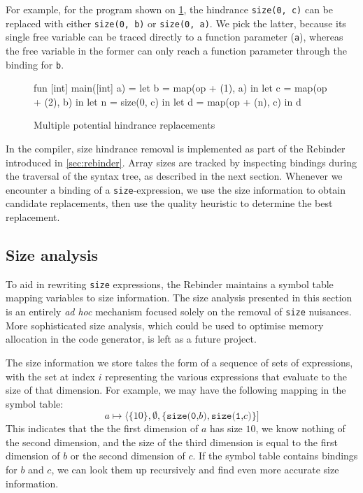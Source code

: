 For example, for the program shown on
\cref{fig:multiple-replacements}, the hindrance \texttt{size(0, c)}
can be replaced with either \texttt{size(0, b)} or \texttt{size(0,
  a)}.  We pick the latter, because its single free variable can be
traced directly to a function parameter (\texttt{a}), whereas the free
variable in the former can only reach a function parameter through the
binding for \texttt{b}.

\begin{figure}
\begin{center}
\begin{bcolorcode}
fun [int] main([int] a) =
  let b = map(op + (1), a) in
  let c = map(op + (2), b) in
  let n = size(0, c) in
  let d = map(op + (n), c) in
  d
\end{bcolorcode}
\end{center}
\caption{Multiple potential hindrance replacements}
\label{fig:multiple-replacements}
\end{figure}

In the \LO{} compiler, size hindrance removal is implemented as part
of the Rebinder introduced in \cref{sec:rebinder}.  Array sizes are
tracked by inspecting bindings during the traversal of the syntax
tree, as described in the next section.  Whenever we encounter a
binding of a \texttt{size}-expression, we use the size information to
obtain candidate replacements, then use the quality heuristic to
determine the best replacement.

\subsection{Size analysis}
\label{sec:size-analysis}

To aid in rewriting \texttt{size} expressions, the Rebinder maintains
a symbol table mapping variables to size information.  The size
analysis presented in this section is an entirely \textit{ad hoc}
mechanism focused solely on the removal of \texttt{size} nuisances.
More sophisticated size analysis, which could be used to optimise
memory allocation in the code generator, is left as a future project.

The size information we store takes the form of a sequence of sets of
expressions, with the set at index $i$ representing the various
expressions that evaluate to the size of that dimension.  For example,
we may have the following mapping in the symbol table:
\[
a \mapsto \langle\{10\}, \emptyset, \{\texttt{size(0,$b$)}, \texttt{size(1,$c$)}\}]
\]
This indicates that the the first dimension of $a$ has size $10$, we
know nothing of the second dimension, and the size of the third
dimension is equal to the first dimension of $b$ or the second
dimension of $c$.  If the symbol table contains bindings for $b$ and
$c$, we can look them up recursively and find even more accurate size
information.

